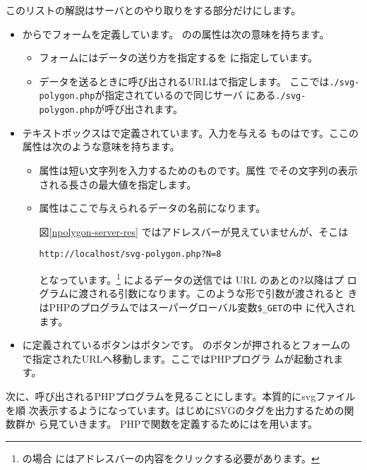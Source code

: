 このリストの解説はサーバとのやり取りをする部分だけにします。
\begin{itemize}
 \item {}からでフォームを定義しています。
       のの属性は次の意味を持ちます。
\begin{itemize}
 \item フォームにはデータの送り方を指定するを
       に指定しています。
 \item データを送るときに呼び出されるURLはで指定します。
       ここでは\texttt{./svg-polygon.php}が指定されているので同じサーバ
       にある\texttt{./svg-polygon.php}が呼び出されます。
\end{itemize}
 \item テキストボックスはで定義されています。入力を与える
       ものはです。ここの属性は次のような意味を持ちます。
\begin{itemize}
 \item 属性は短い文字列を入力するためのものです。属性
       でその文字列の表示される長さの最大値を指定します。
 \item 属性はここで与えられるデータの名前になります。

       図\ref{npolygon-server-res}%
ではアドレスバーが見えていませんが、そこは
\begin{center}
 \texttt{http://localhost/svg-polygon.php?N=8}
\end{center}
       となっています。\footnote{\Operan の場合
       にはアドレスバーの内容をクリックする必要があります。}
       によるデータの送信では URL のあとの\texttt{?}以降はプ
       ログラムに渡される引数になります。このような形で引数が渡されると
       きはPHPのプログラムではスーパーグローバル変数\texttt{\$\_GET}の中
       に代入されます。
\end{itemize}
 \item {}に定義されているボタンはボタンです。
       のボタンが押されるとフォームの
       で指定されたURLへ移動します。ここではPHPプログラ
       ムが起動されます。
\end{itemize}

次に、呼び出されるPHPプログラムを見ることにします。本質的にsvgファイルを順
次表示するようになっています。はじめにSVGのタグを出力するための関数群か
ら見ていきます。
PHPで関数を定義するためにはを用います。


